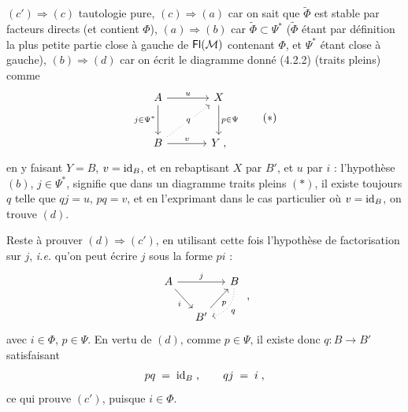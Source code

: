 $(c')\Longrightarrow(c)$ tautologie pure, $(c)\Longrightarrow(a)$ car on sait que $\widetilde{\Phi}$ est stable par facteurs directs (et contient $\Phi$), $(a)\Longrightarrow(b)$ car $\widetilde{\Phi}\subset\Psi^*$ ($\widetilde{\Phi}$ étant par définition la plus petite partie close à gauche de $\mathsf{Fl}(\mathcal{M})$ contenant $\Phi$, et $\Psi^*$ étant close à gauche), $(b)\Longrightarrow(d)$ car on écrit le diagramme donné (4.2.2) (traits pleins) comme %
\[
\begin{tikzcd}[row sep=large, column sep=large]
A \arrow[r, "u"] \arrow[d, "j\in\Psi^*"'] & X \arrow[d, "p\in\Psi"] \\
B \arrow[ur, dotted, "q" description] \arrow[r, "v"] & Y \;,
\end{tikzcd}
\tag*{$(*)$}
\]
en y faisant $Y=B$, $v=\mathrm{id}_B$, et en rebaptisant $X$ par $B'$, et $u$ par $i$ : l'hypothèse $(b)$, $j\in\Psi^*$, signifie que dans un diagramme traits pleins $(*)$, il existe toujours $q$ telle que $qj=u$, $pq=v$, et en l'exprimant dans le cas particulier où $v=\mathrm{id}_B$, on trouve $(d)$.

Reste à prouver $(d)\Longrightarrow(c')$, en utilisant cette fois l'hypothèse de factorisation sur $j$, \textit{i.e.} qu'on peut écrire $j$ sous la forme $pi$ :
\[
\begin{tikzcd}[column sep=small]
A \arrow[rr, "j"] \arrow[dr, "i"'] & & B \arrow[dl, dotted, bend left=40, "q"] \\
& B' \arrow[ur, "p"'] &
\end{tikzcd}
\;,
\]
avec $i\in\Phi$, $p\in\Psi$. En vertu de $(d)$, comme $p\in\Psi$, il existe donc $q:B\longrightarrow B'$ satisfaisant
\[
pq \;=\; \mathrm{id}_B\;, \qquad qj \;=\; i\;,
\]
ce qui prouve $(c')$, puisque $i\in\Phi$.


